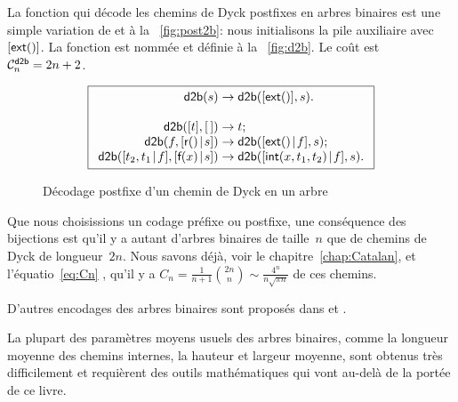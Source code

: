 La fonction qui décode les chemins de Dyck
postfixes en arbres binaires est une simple variation de
 et
 à la
\fig~\vref{fig:post2b}: nous initialisons la pile auxiliaire avec
\([\fun{ext}()]\). La fonction est nommée
 et définie à la
\fig~\vref{fig:d2b}. Le coût est \(\C{\fun{d2b}}{n} = 2n +
2\).

\bigskip

\begin{figure}[h]
\begin{equation*}
\boxed{
\begin{array}{r@{\;}c@{\;}l}
\fun{d2b}(s) & \rightarrow & \fun{d2b}([\fun{ext}()],s).\\
\\
\fun{d2b}([t],\el) & \rightarrow & t;\\
\fun{d2b}(f,\cons{\fun{r}()}{s}) & \rightarrow & \fun{d2b}(\cons{\fun{ext}()}{f},s);\\
\fun{d2b}(\cons{t_2,t_1}{f},\cons{\fun{f}(x)}{s}) & \rightarrow & \fun{d2b}(\cons{\fun{int}(x,t_1,t_2)}{f},s).
\end{array}}
\end{equation*}
\caption{Décodage postfixe d'un chemin de Dyck en un arbre}
\label{fig:d2b}
\end{figure}

\bigskip

Que nous choisissions un codage préfixe ou postfixe, une conséquence
des bijections est qu'il y a autant d'arbres binaires de taille~\(n\)
que de chemins de Dyck de longueur~\(2n\). Nous savons déjà, voir le chapitre~\ref{chap:Catalan}, et l'équatio~\eqref{eq:Cn}
, qu'il y a \(C_n = \frac{1}{n+1}\binom{2n}{n}
\sim \frac{4^n}{n\sqrt{\pi n}}\) de ces chemins.

D'autres encodages des arbres binaires sont proposés dans
\cite[2.3.3]{Knuth_1997} et \cite[5.11]{SedgewickFlajolet_1996}.



La plupart des paramètres moyens usuels des arbres binaires, comme la
longueur moyenne des chemins internes, la hauteur et largeur moyenne,
sont obtenus très difficilement et requièrent des outils mathématiques
qui vont au-delà de la portée de ce livre.

